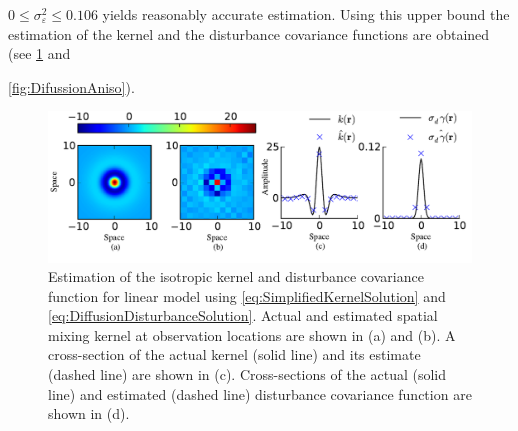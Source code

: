 \documentclass[10pt,twocolumn,twoside]{IEEEtran}
\begin{document}
$0\le\sigma_{\varepsilon}^2\le 0.106$ yields reasonably accurate estimation. Using this upper bound the estimation of the kernel and the disturbance covariance functions are obtained (see \figurename{\ref{fig:DiffusionIso}} and \figurename{\ref{fig:DifussionAniso}). 
\begin{figure}[h]
	\centering
		\includegraphics[scale=1]{./Graph/DisturbanceKernelEstimationLinearIso.pdf}
	\caption{Estimation of the isotropic kernel and disturbance covariance function for linear model using \eqref{eq:SimplifiedKernelSolution} and \eqref{eq:DiffusionDisturbanceSolution}. Actual and  estimated spatial mixing kernel at observation locations are shown in (a) and (b).  A cross-section of the actual kernel (solid line) and its estimate  (dashed line) are shown in (c). Cross-sections of the actual (solid line) and estimated (dashed line) disturbance covariance function are shown in (d).}
	\label{fig:DiffusionIso} 
	\end{figure}
	
}
\end{document}
